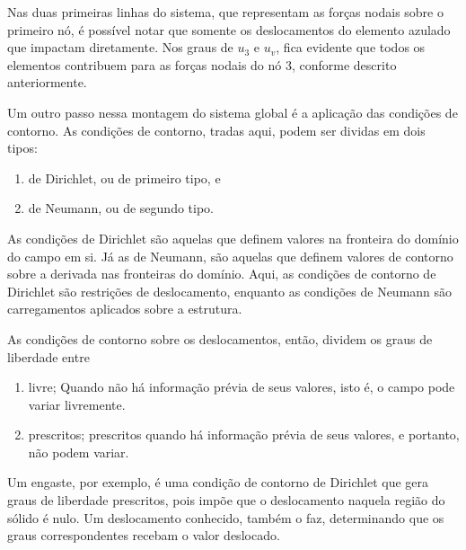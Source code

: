 Nas duas primeiras linhas do sistema, que representam as forças nodais sobre o primeiro nó, é possível notar que somente os deslocamentos do elemento azulado que impactam diretamente. Nos graus de $u_3$ e $u_v$, fica evidente que todos os elementos contribuem para as forças nodais do nó $3$, conforme descrito anteriormente.

Um outro passo nessa montagem do sistema global é a aplicação das condições de contorno. As condições de contorno, tradas aqui, podem ser dividas em dois tipos: 

\begin{enumerate}
    \item de Dirichlet, ou de primeiro tipo, e
    \item de Neumann, ou de segundo tipo.
\end{enumerate}

 As condições de Dirichlet são aquelas que definem valores na fronteira do domínio do campo em si. Já as de Neumann, são aquelas que definem valores de contorno sobre a derivada nas fronteiras do domínio.  Aqui, as condições de contorno de Dirichlet são restrições de deslocamento, enquanto as condições de Neumann são carregamentos aplicados sobre a estrutura.

As condições de contorno sobre os deslocamentos, então, dividem os graus de liberdade entre 

\begin{enumerate}
    \item livre;
    Quando não há informação prévia de seus valores, isto é, o campo pode variar livremente.
    \item prescritos;
    prescritos quando há informação prévia de seus valores, e portanto, não podem variar.
    \cite{LOGAN}
\end{enumerate}

Um engaste, por exemplo, é uma condição de contorno de Dirichlet que gera graus de liberdade prescritos, pois impõe que o deslocamento naquela região do sólido é nulo. Um deslocamento conhecido, também o faz, determinando que os graus correspondentes recebam o valor deslocado.

